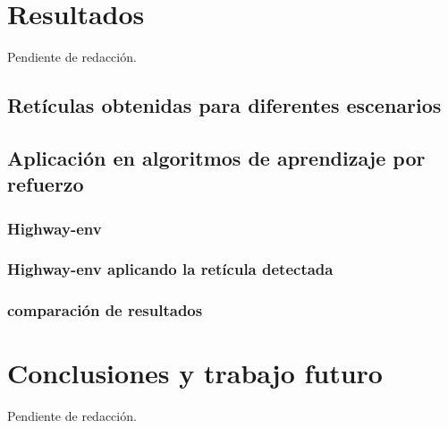 \documentclass[10pt,letterpaper,final]{article}
\begin{document}
\clearpage
\section{Resultados}
Pendiente de redacción.
\subsection{Retículas obtenidas para diferentes escenarios}
\subsection{Aplicación en algoritmos de aprendizaje por refuerzo}
\subsubsection{Highway-env}
\subsubsection{Highway-env aplicando la retícula detectada}
\subsubsection{comparación de resultados}

\clearpage
\section{Conclusiones y trabajo futuro}
Pendiente de redacción.

\clearpage


\end{document}
